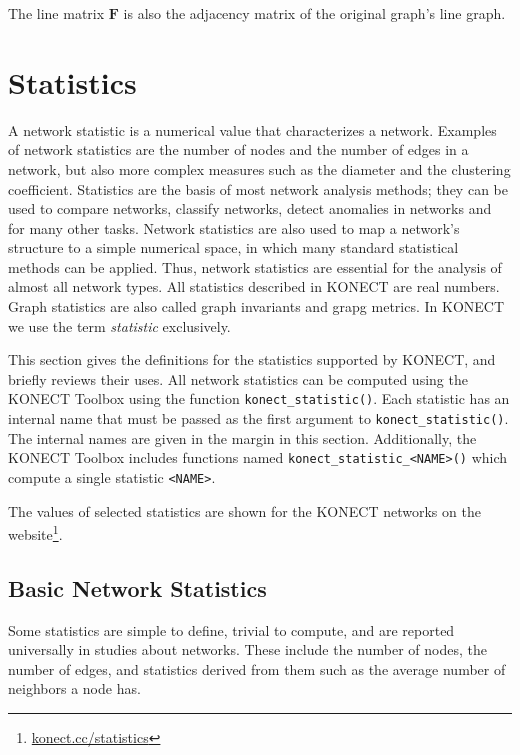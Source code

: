 \documentclass{article}
\begin{document}
The line matrix $\mathbf F$ is also the adjacency matrix of the original
graph's line graph. 

\section{Statistics}
\label{sec:statistics}
A network statistic is a numerical value that characterizes a network.
Examples of network statistics are the number of nodes and the number of
edges in a network, but also more complex measures such as the diameter and the
clustering coefficient.  
Statistics are the basis of most network analysis methods; they can be
used to compare networks, classify networks, detect anomalies in
networks and for many other tasks.  Network statistics are also used to
map a network's structure 
to a simple numerical space, in which many standard statistical
methods can be applied.  Thus, network statistics are essential for the
analysis of almost all network types. 
All statistics described in KONECT are real numbers.
Graph statistics are also called graph invariants and grapg metrics.  In
KONECT we use the term \emph{statistic} exclusively. 

This section gives the definitions for the statistics supported by
KONECT, and briefly reviews their uses.  
All network statistics can be computed using the KONECT Toolbox using
the function \texttt{konect\_statistic()}. Each statistic has an
internal name that must be passed as the first argument to
\texttt{konect\_statistic()}.  The internal names are given in the
margin in this section. 
Additionally, the KONECT Toolbox includes functions named
\texttt{konect\_statistic\_<NAME>()} which compute a single statistic
\texttt{<NAME>}. 

The values of selected statistics are
shown for the KONECT networks on the
website\footnote{\href{http://konect.cc/statistics/}{konect.cc/statistics}}.  

\subsection{Basic Network Statistics}
Some statistics are simple to define, trivial to compute, and 
are reported universally in studies about networks.  These include the
number of nodes, the number of edges, and statistics derived from them
such as the average number of neighbors a node has.  
\end{document}
